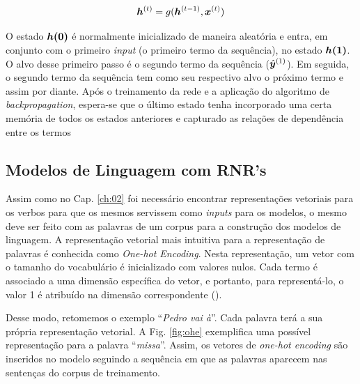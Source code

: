 \begin{equation}
\bm{h}^{(t)} = g(\bm{h}^{(t-1)}, \bm{x}^{(t)})
\label{eq:rnn}
\end{equation}


O estado $\bm{h(0)}$ é normalmente inicializado de maneira aleatória e entra, em conjunto com o primeiro \textit{input} (o primeiro termo da sequência), no estado $\bm{h(1)}$. O alvo desse primeiro passo é o segundo termo da sequência ($\hat{\bm{y}}^{(1)}$). Em seguida, o segundo termo da sequência tem como seu respectivo alvo o próximo termo e assim por diante. Após o treinamento da rede e a aplicação do algoritmo de \textit{backpropagation}, espera-se que o último estado tenha incorporado uma certa memória de todos os estados anteriores e capturado as relações de dependência entre os termos%

\subsection{Modelos de Linguagem com RNR's}

Assim como no Cap. \ref{ch:02} foi necessário encontrar representações vetoriais para os verbos para que os mesmos servissem como \textit{inputs} para os modelos, o mesmo deve ser feito com as palavras de um corpus para a construção dos modelos de linguagem. A representação vetorial mais intuitiva para a representação de palavras é conhecida como \textit{One-hot Encoding}. Nesta representação, um vetor com o tamanho do vocabulário é inicializado com valores nulos. Cada termo é associado a uma dimensão específica do vetor, e portanto, para representá-lo, o valor 1 é atribuído na dimensão correspondente (\cite{harris:2013}). 

Desse modo, retomemos o exemplo “\textit{Pedro vai à}”. Cada palavra terá a sua própria representação vetorial. A Fig. \ref{fig:ohe} exemplifica uma possível representação para a palavra “\textit{missa}”. Assim, os vetores de \textit{one-hot encoding} são inseridos no modelo seguindo a sequência em que as palavras aparecem nas sentenças do corpus de treinamento. 



